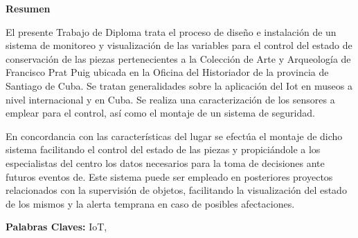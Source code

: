 \setcounter{page}{4}
\thispagestyle{empty}

    \textbf{\Large Resumen}
\newline

El presente Trabajo de Diploma trata el proceso de diseño e instalación de un sistema de monitoreo y visualización de las variables para el control del estado de conservación de las piezas pertenecientes a la Colección de Arte y Arqueología de Francisco Prat Puig ubicada en la Oficina del Historiador de la provincia de Santiago de Cuba. Se tratan generalidades sobre la aplicación del Iot en museos a nivel internacional y en Cuba. Se realiza una caracterización de los sensores a emplear para el control, así como el montaje de un sistema de seguridad.

En concordancia con las características del lugar se efectúa el montaje de dicho sistema facilitando el control del estado de las piezas y propiciándole a los especialistas del centro los datos necesarios para la toma de decisiones ante futuros eventos de. Este sistema puede ser empleado en posteriores proyectos relacionados con la supervisión de objetos, facilitando la visualización del estado de los mismos y la alerta temprana en caso de posibles afectaciones.

\vfill

\begin{flushleft}
    \textbf{Palabras Claves: }IoT, 
\end{flushleft}